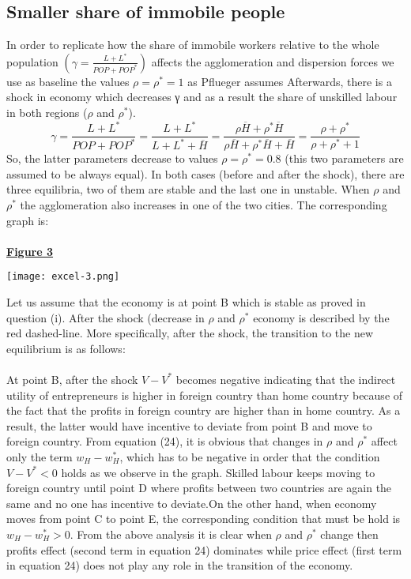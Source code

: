 \documentclass[11pt]{article}
\begin{document}
	\subsection{Smaller share of immobile people}
	In order to replicate how the share of immobile workers relative to the whole population $\left( \gamma=\frac{L+L^{\ast}}{POP+POP^{\ast}} \right)$ affects the agglomeration and dispersion forces we use as baseline the values $\rho=\rho^{\ast}=1$ as Pflueger assumes Afterwards, there is a shock in economy which decreases γ and as a result the share of unskilled labour in both regions ($\rho$ and $\rho^{\ast}$).\\
$$\gamma=\frac{L+L^{\ast}}{POP+POP^{\ast}}=\frac{L+L^{\ast}}{L+L^{\ast}+\overline{H}}=\frac{\rho \overline{H}+\rho^{\ast}\overline{H}}{\rho \overline{H}+\rho^{\ast}\overline{H}+\overline{H}}=\frac{\rho+\rho^{\ast}}{\rho+\rho^{\ast}+1}$$
So, the latter parameters decrease to values $\rho=\rho^{\ast}=0.8$ (this two parameters are assumed to be always equal). In both cases (before and after the shock), there are three equilibria, two of them are stable and the last one in unstable. When $\rho$ and $\rho^{\ast}$ the agglomeration also increases in one of the two cities. The corresponding graph is: \\
\\
\underline{\Large{\textbf{Figure 3}}}
\begin{center}
\texttt{[image: excel-3.png]}
\end{center}
Let us assume that the economy is at point B which is stable as proved in question (i). After the shock (decrease in $\rho$ and $\rho^{\ast}$ economy is described by the red dashed-line. More specifically, after the shock, the transition to the new equilibrium is as follows: \\
\\
At point B, after the shock $V-V^{\ast}$ becomes negative indicating that the indirect utility of entrepreneurs is higher in foreign country than home country because of the fact that the profits in foreign country are higher than in home country. As a result, the latter would have incentive to deviate from point B and move to foreign country. From equation (24), it is obvious that changes in $\rho$ and $\rho^{\ast}$ affect only the term $w_{H}-w_{H}^\ast$, which has to be negative in order that the condition $V-V^{\ast}<0$ holds as we observe in the graph. Skilled labour keeps moving to foreign country until point D where profits between two countries are again the same and no one has incentive to deviate.On the other hand, when economy moves from point C to point E, the corresponding condition that must be hold is $w_{H}-w_{H}^\ast>0$. From the above analysis it is clear when $\rho$ and $\rho^{\ast}$ change then profits effect (second term in equation 24) dominates while price effect (first term in equation 24) does not play any role in the transition of the economy.
\\   
\end{document}
